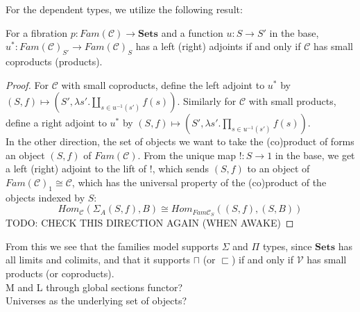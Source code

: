 For the dependent types, we utilize the following result:
\begin{thm}
For a fibration $p : Fam(\mathcal{C}) \to \mathbf{Sets}$ and a function $u : S \to S'$ in the base, $u^* : Fam(\mathcal{C})_{S'} \to Fam(\mathcal{C})_S$ has a left (right) adjoints if and only if $\mathcal{C}$ has small coproducts (products).
  \begin{proof}
    For $\mathcal{C}$ with small coproducts, define the left adjoint to $u^*$ by $(S, f) \mapsto (S', \lambda s'.\coprod_{s \in u^{-1}(s')}f(s))$. Similarly for $\mathcal{C}$ with small products, define a right adjoint to $u^*$ by $(S, f) \mapsto (S', \lambda s'.\prod_{s \in u^{-1}(s')}f(s))$.\\
    In the other direction, the set of objects we want to take the (co)product of forms an object $(S, f)$ of $Fam(\mathcal{C})$. From the unique map $! : S \to 1$ in the base, we get a left (right) adjoint to the lift of $!$, which sends $(S, f)$ to an object of $Fam(\mathcal{C})_1 \cong \mathcal{C}$, which has the universal property of the (co)product of the objects indexed by $S$:
    \[
      Hom_{\mathcal{C}}(\Sigma_A(S, f), B) \cong Hom_{Fam{\mathcal{C}}_S}((S, f), (S, B ))
    \]
    TODO: CHECK THIS DIRECTION AGAIN (WHEN AWAKE)
  \end{proof}
\end{thm}
From this we see that the families model supports $\Sigma$ and $\Pi$ types, since $\mathbf{Sets}$ has all limits and colimits, and that it supports $\sqcap$ (or $\sqsubset$) if and only if $\mathcal{V}$ has small products (or coproducts).\\
M and L through global sections functor?\\
Universes as the underlying set of objects?
